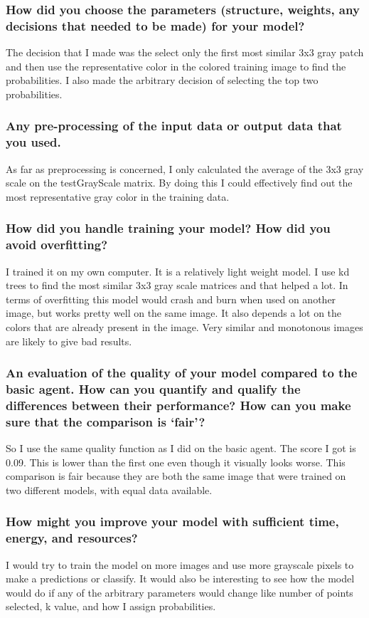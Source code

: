 \documentclass[12pt]{article} %
\begin{document}
\subsubsection{How did you choose the parameters (structure, weights, any decisions that needed to be made) for your model?}
The decision that I made was the select only the first most similar 3x3 gray patch and then use the representative color in the colored training image to find the probabilities. I also made the arbitrary decision of selecting the top two probabilities. 

\subsubsection{Any pre-processing of the input data or output data that you used.}
As far as preprocessing is concerned, I only calculated the average of the 3x3 gray scale on the testGrayScale matrix. By doing this I could effectively find out the most representative gray color in the training data. 

\subsubsection{How did you handle training your model? How did you avoid overfitting?}
I trained it on my own computer. It is a relatively light weight model. I use kd trees to find the most similar 3x3 gray scale matrices and that helped a lot. In terms of overfitting this model would crash and burn when used on another image, but works pretty well on the same image. It also depends a lot on the colors that are already present in the image. Very similar and monotonous images are likely to give bad results. 

\subsubsection{An evaluation of the quality of your model compared to the basic agent. How can you quantify and qualify the
differences between their performance? How can you make sure that the comparison is ‘fair’?}

So I use the same quality function as I did on the basic agent. The score I got is 0.09. This is lower than the first one even though it visually looks worse. This comparison is fair because they are both the same image that were trained on two different models, with equal data available. 

\subsubsection{How might you improve your model with sufficient time, energy, and resources?}
I would try to train the model on more images and use more grayscale pixels to make a predictions or classify. It would also be interesting to see how the model would do if any of the arbitrary parameters would change like number of points selected, k value, and how I assign probabilities. 
\pagebreak
\end{document}
